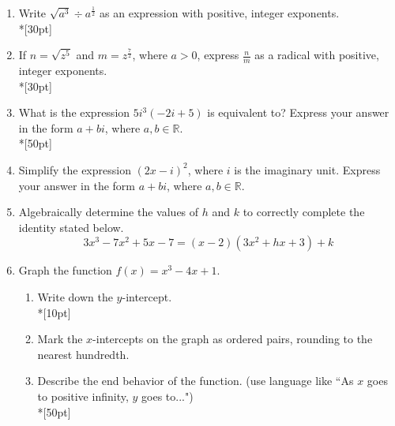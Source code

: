 \documentclass[12pt, oneside]{article}
\begin{document}
\begin{enumerate}
\item Write $\sqrt{a^3} \div a^{\frac{1}{2}}$ as an expression with positive, integer exponents.\\*[30pt]

\item If $n=\sqrt{z^5}$ and $m=z^{\frac{7}{2}}$, where $a > 0$, express $\frac{n}{m}$ as a radical with positive, integer exponents. \\*[30pt]

\item What is the expression $5i^3(-2i+5)$ is equivalent to? Express your answer in the form $a+bi$, where $a, b \in \mathbb{R}$.\\*[50pt]  %

\item Simplify the expression $(2x - i)^2$, where $i$ is the imaginary unit. Express your answer in the form $a+bi$, where $a, b \in \mathbb{R}$.\\[50pt] %

\item Algebraically determine the values of $h$ and $k$ to correctly complete the identity stated below.
\[3x^3-7x^2+5x-7=(x-2)(3x^2+hx+3)+k\] %

\newpage
\item Graph the function $f(x)=x^3-4x+1$. 
\begin{enumerate}
    \item Write down the $y$-intercept.\\*[10pt]
    \item Mark the $x$-intercepts on the graph as ordered pairs, rounding to the nearest hundredth.
    \item Describe the end behavior of the function. (use language like ``As $x$ goes to positive infinity, $y$ goes to...")\\*[50pt]
\end{enumerate}


\end{enumerate}
\end{document}
